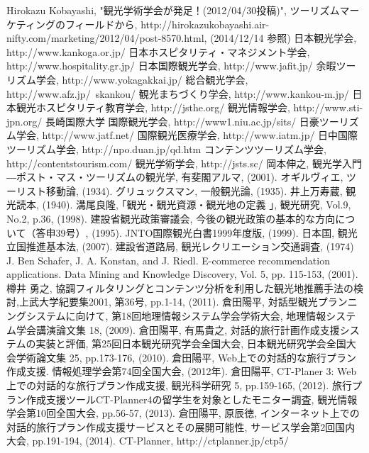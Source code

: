 \begin{thebibliography}{report}
 Hirokazu Kobayashi, "観光学術学会が発足！(2012/04/30投稿)", ツーリズムマーケティングのフィールドから, http://hirokazukobayashi.air-nifty.com/marketing/2012/04/post-8570.html, (2014/12/14 参照)
 日本観光学会, http://www.kankoga.or.jp/
 日本ホスピタリティ・マネジメント学会, http://www.hospitality.gr.jp/
 日本国際観光学会, http://www.jafit.jp/
 余暇ツーリズム学会, http://www.yokagakkai.jp/
 総合観光学会, http://www.afz.jp/~skankou/
 観光まちづくり学会, http://www.kankou-m.jp/
 日本観光ホスピタリティ教育学会, http://jsthe.org/
 観光情報学会, http://www.sti-jpn.org/
 長崎国際大学 国際観光学会, http://www1.niu.ac.jp/sits/
 日豪ツーリズム学会, http://www.jatf.net/
 国際観光医療学会, http://www.iatm.jp/
 日中国際ツーリズム学会, http://npo.duan.jp/qd.htm
 コンテンツツーリズム学会, http://contentstourism.com/
 観光学術学会, http://jsts.sc/
 岡本伸之, 観光学入門―ポスト・マス・ツーリズムの観光学, 有斐閣アルマ, (2001).
 オギルヴィエ, ツーリスト移動論, (1934).
 グリュックスマン, 一般観光論, (1935).
 井上万寿蔵, 観光読本, (1940).
 溝尾良隆, ｢観光・観光資源・観光地の定義 ｣, 観光研究, Vol.9, No.2, p.36, (1998).
 建設省観光政策審議会, 今後の観光政策の基本的な方向について（答申39号）, (1995).
 JNTO国際観光白書1999年度版, (1999).
 日本国, 観光立国推進基本法, (2007).
 建設省道路局, 観光レクリエーション交通調査, (1974)
 J. Ben Schafer, J. A. Konstan, and J. Riedl. E-commerce recommendation applications. Data Mining and Knowledge Discovery, Vol. 5, pp. 115-153, (2001).
 樽井 勇之, 協調フィルタリングとコンテンツ分析を利用した観光地推薦手法の検討,上武大学紀要集2001, 第36号, pp.1-14, (2011).
 倉田陽平, 対話型観光プランニングシステムに向けて, 第18回地理情報システム学会学術大会, 地理情報システム学会講演論文集 18, (2009).
 倉田陽平, 有馬貴之, 対話的旅行計画作成支援システムの実装と評価, 第25回日本観光研究学会全国大会, 日本観光研究学会全国大会学術論文集 25, pp.173-176, (2010).
 倉田陽平, Web上での対話的な旅行プラン作成支援. 情報処理学会第74回全国大会, (2012年).
 倉田陽平, CT-Planer 3: Web上での対話的な旅行プラン作成支援, 観光科学研究 5, pp.159-165, (2012). 
 旅行プラン作成支援ツールCT-Planner4の留学生を対象としたモニター調査, 観光情報学会第10回全国大会, pp.56-57, (2013).
 倉田陽平, 原辰徳, インターネット上での対話的旅行プラン作成支援サービスとその展開可能性, サービス学会第2回国内大会, pp.191-194, (2014).
 CT-Planner, http://ctplanner.jp/ctp5/


\end{thebibliography}

